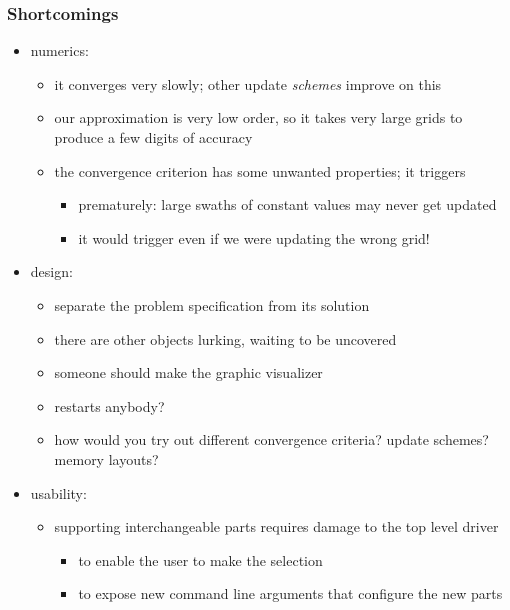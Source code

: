 \begin{frame}[fragile]
%
  \frametitle{Shortcomings}
%
  \begin{itemize}
%
  \item numerics:
    \begin{itemize}
    \item it converges very slowly; other update {\em schemes} improve on this
    \item our approximation is very low order, so it takes very large grids to produce a few
      digits of accuracy
    \item the convergence criterion has some unwanted properties; it triggers
      \begin{itemize}
      \item prematurely: large swaths of constant values may never get updated
      \item it would trigger even if we were updating the wrong grid!
      \end{itemize}
    \end{itemize}
%
  \item design:
    \begin{itemize}
    \item separate the problem specification from its solution
    \item there are other objects lurking, waiting to be uncovered
    \item someone should make the graphic visualizer
    \item restarts anybody?
    \item how would you try out different convergence criteria? update schemes? memory layouts?
    \end{itemize}
%
    \item usability:
      \begin{itemize}
      \item supporting interchangeable parts requires damage to the top level driver
        \begin{itemize}
        \item to enable the user to make the selection
        \item to expose new command line arguments that configure the new parts
        \end{itemize}
      \end{itemize}
%
  \end{itemize}
%
\end{frame}

